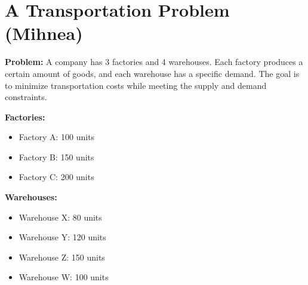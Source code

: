 \documentclass{purdue-slide}
\begin{document}
\section{A Transportation Problem (Mihnea)}

\begin{frame}
	\textbf{Problem:} A company has 3 factories and 4 warehouses. Each factory produces a certain amount of goods, and each warehouse has a specific demand. The goal is to minimize transportation costs while meeting the supply and demand constraints.

	\bigskip

	\textbf{Factories:}
	\begin{itemize}
		\item Factory A: 100 units
		\item Factory B: 150 units
		\item Factory C: 200 units
	\end{itemize}

	\textbf{Warehouses:}
	\begin{itemize}
		\item Warehouse X: 80 units
		\item Warehouse Y: 120 units
		\item Warehouse Z: 150 units
		\item Warehouse W: 100 units
	\end{itemize}
\end{frame}
\end{document}
